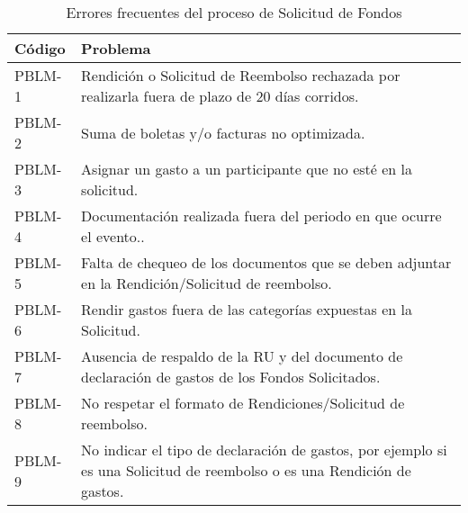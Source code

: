 \begin{table}[htbp]
    \centering
    \caption{Errores frecuentes del proceso de Solicitud de Fondos}
    \label{tab: Errores_frecuentes_Fondo}
    \begin{tabular}{| p{2.6cm}| p{12.2cm} |}
    \hline
    Código & Problema \\
    \hline \hline
    
    PBLM-1 & Rendición o Solicitud de Reembolso rechazada por realizarla fuera de plazo de 20 días corridos. \\ \hline

    PBLM-2 & Suma de boletas y/o facturas no optimizada. \\ \hline

    PBLM-3 & Asignar un gasto a un participante que no esté en la solicitud. \\ \hline

    PBLM-4 & Documentación realizada fuera del periodo en que ocurre el evento.. \\ \hline

    PBLM-5 & Falta de chequeo de los documentos que se deben adjuntar en la Rendición/Solicitud de reembolso. \\ \hline

    PBLM-6 & Rendir gastos fuera de las categorías expuestas en la Solicitud. \\ \hline

    PBLM-7 & Ausencia de respaldo de la RU y del documento de declaración de gastos de los Fondos Solicitados. \\ \hline

    PBLM-8 & No respetar el formato de Rendiciones/Solicitud de reembolso. \\ \hline

    PBLM-9 & No indicar el tipo de declaración de gastos, por ejemplo si es una Solicitud de reembolso o es una Rendición de gastos. \\ \hline
    \end{tabular}
\end{table}